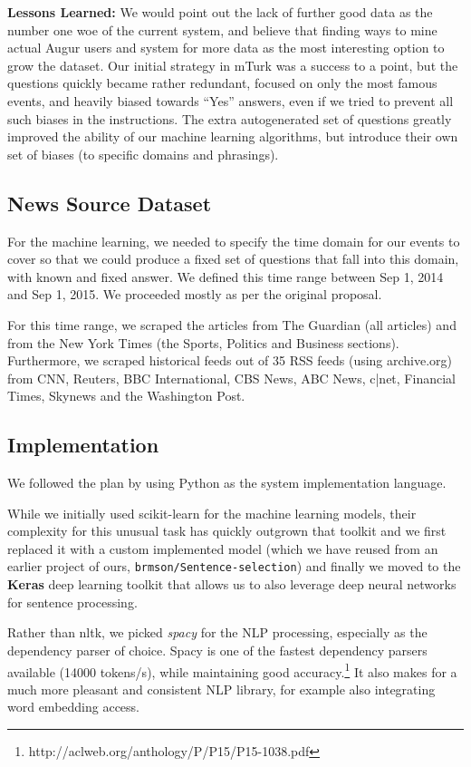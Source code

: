 \documentclass[11pt,a4paper]{article}
\begin{document}
\textbf{Lessons Learned:} We would point out the lack of further good data
as the number one woe of the current system, and believe that finding ways
to mine actual Augur users and system for more data as the most interesting
option to grow the dataset.  Our initial strategy in mTurk was a success
to a point, but the questions quickly became rather redundant, focused on
only the most famous events, and heavily biased towards ``Yes'' answers,
even if we tried to prevent all such biases in the instructions.
The extra autogenerated set of questions greatly improved the ability
of our machine learning algorithms, but introduce their own set of biases
(to specific domains and phrasings).


\subsection{News Source Dataset}

For the machine learning, we needed to specify the time domain for our
events to cover so that we could produce a fixed set of questions that fall
into this domain, with known and fixed answer.  We defined this time range
between Sep 1, 2014 and Sep 1, 2015.  We proceeded mostly as per the original
proposal.

For this time range, we scraped the articles from The Guardian (all articles)
and from the New York Times (the Sports, Politics and Business sections).
Furthermore, we scraped historical feeds out of 35 RSS feeds (using archive.org)
from CNN, Reuters, BBC International, CBS News, ABC News, c|net, Financial Times,
Skynews and the Washington Post.

\subsection{Implementation}

We followed the plan by using Python as the system implementation language.

While we initially used scikit-learn for the machine learning models,
their complexity for this unusual task has quickly outgrown that toolkit
and we first replaced it with a custom implemented model (which we have
reused from an earlier project of ours, \texttt{brmson/Sentence-selection})
and finally we moved to the \textbf{Keras} deep learning toolkit that
allows us to also leverage deep neural networks for sentence processing.

Rather than nltk, we picked \textit{spacy} for the NLP processing,
especially as the dependency parser of choice. Spacy is one of
the fastest dependency parsers available (14000 tokens/s), while maintaining good accuracy.\footnote{http://aclweb.org/anthology/P/P15/P15-1038.pdf}
It also makes for a much more pleasant and consistent NLP library,
for example also integrating word embedding access.
\end{document}
